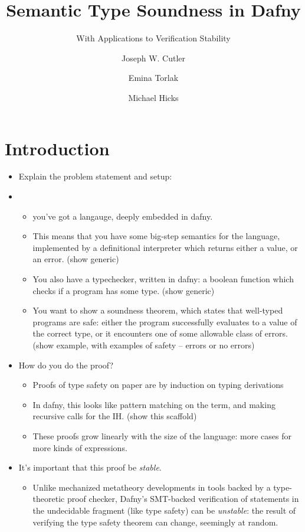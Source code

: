 \documentclass[sigplan,review,screen,anonymous]{acmart}
\author{Joseph W. Cutler}
\affiliation{%
  \institution{University of Pennsylvania}
  \city{Philadelphia}
  \state{Pennsylvania}
  \country{USA}
}
\author{Emina Torlak}
\affiliation{%
  \institution{Amazon Web Services}
  \city{Seattle}
  \state{Washington}
  \country{USA}
}
\author{Michael Hicks}
\affiliation{%
  \institution{Amazon Web Services}
  \city{Arlington}
  \state{Virginia}
  \country{USA}
}
\title{Semantic Type Soundness in Dafny}
\subtitle{With Applications to Verification Stability}
\begin{document}
\maketitle

\section{Introduction}

\begin{itemize}
    \item Explain the problem statement and setup:
    \item \begin{itemize}
      \item you've got a langauge, deeply embedded in dafny.
      \item This means that you have some big-step semantics for the language, implemented by a definitional interpreter which returns either a value, or an error. (show generic)
      \item You also have a typechecker, written in dafny: a boolean function which checks if a program has some type.  (show generic)
      \item You want to show a soundness theorem, which states that well-typed programs are safe: either the program successfully evaluates to a value of the correct type, or it encounters one of some allowable class of errors. (show example, with examples of safety -- errors or no errors)
    \end{itemize}

    \item How do you do the proof?
    \begin{itemize}
      \item Proofs of type safety on paper are by induction on typing derivations
      \item In dafny, this looks like pattern matching on the term, and making recursive calls for the IH. (show this scaffold)
      \item These proofs grow linearly with the size of the language: more cases for more kinds of expressions.
    \end{itemize}

    \item It's important that this proof be \emph{stable}. 
    \begin{itemize}
      \item Unlike mechanized metatheory developments in tools backed by a type-theoretic proof checker, Dafny's SMT-backed verification
      of statements in the undecidable fragment (like type safety) can be \emph{unstable}: the result of verifying the type safety theorem
      can change, seemingly at random.


\end{itemize}
\end{itemize}
\end{document}
